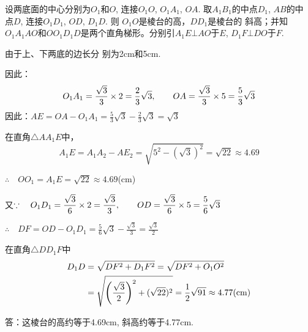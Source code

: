 \begin{figure}[htp]
    \centering
{}
    \caption{}
\end{figure}


\begin{solution}
设两底面的中心分别为$O_1$和$O$, 连接$O_1O$, $O_1A_1$,
 $OA$. 取$A_1B_1$的中点$D_1$, $AB$的中
点$D$, 连接$O_1D_1$, $OD$, $D_1D$. 则
$O_1O$是棱台的高，$DD_1$是棱台的
斜高；并知$O_1A_1AO$和$OO_1D_1D$是两个直角梯形。分别引$A_1E\bot
AO$于$E$, $D_1F\bot DO$于$F$. 

由于上、下两底的边长分
别为2cm和5cm.

因此：
\[O_1A_1=\frac{\sqrt{3}}{3}\x 2=\frac{2}{3}\sqrt{3}, \qquad  OA=\frac{\sqrt{3}}{3}\x 5=\frac{5}{3}\sqrt{3}\]
因此：$AE=OA-O_1A_1=\frac{5}{3}\sqrt{3}-\frac{2}{3}\sqrt{3}=\sqrt{3}$


在直角$\triangle AA_1E$中，
\[A_1E=A_1A_2-AE_2=\sqrt{5^2-(\sqrt{3})^2}=\sqrt{22}\approx 4.69\]

$\therefore\quad OO_1=A_1E=\sqrt{22}\approx 4.69$(cm)

又$\because\quad O_1D_1=\frac{\sqrt{3}}{6}\x 2=\frac{\sqrt{3}}{3},\qquad OD=\frac{\sqrt{3}}{6}\x 5=\frac{5}{6}{\sqrt{3}}$

$\therefore\quad DF=OD-O_1D_1=\frac{5}{6}{\sqrt{3}}-\frac{\sqrt{3}}{3}=\frac{\sqrt{3}}{2}$

在直角$\triangle DD_1F$中
\[\begin{split}
    D_1D&=\sqrt{DF^2+D_1F^2}=\sqrt{DF^2+O_1O^2}\\
&=\sqrt{\left(\frac{\sqrt{3}}{2}\right)^2+(\sqrt{22})^2}=\frac{1}{2}\sqrt{91}\approx 4.77({\rm cm})
\end{split}\]

答：这棱台的高约等于4.69cm, 斜高约等于4.77cm.
\end{solution}

